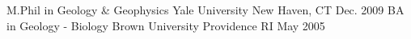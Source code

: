 \documentclass[11pt, a4paper]{awesome-cv}
\begin{document}

\begin{cventries}
  \cventry
    {M.Phil in Geology \& Geophysics}
    {Yale University}
    {New Haven, CT}
    {Dec. 2009}
    {}
  \cventrytight
    {BA in Geology - Biology}
    {Brown University}
    {Providence RI}
    {May 2005}
    {}
\end{cventries}
\end{document}
